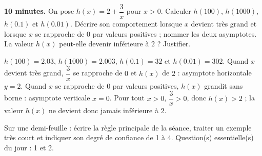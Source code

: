 
\begin{homework}\textbf{10 minutes.} On pose $h(x)=2+\dfrac3x$ pour $x>0$. Calculer $h(100)$, $h(\num{1000})$, $h(\num{0,1})$ et $h(\num{0,01})$. Décrire son comportement lorsque $x$ devient très grand et lorsque $x$ se rapproche de $0$ par valeurs positives ; nommer les deux asymptotes. La valeur $h(x)$ peut-elle devenir inférieure à $2$ ? Justifier.\end{homework}
\begin{solution}$h(100)=\num{2,03}$, $h(\num{1000})=\num{2,003}$, $h(\num{0,1})=32$ et $h(\num{0,01})=302$. Quand $x$ devient très grand, $\dfrac3x$ se rapproche de $0$ et $h(x)$ de $2$ : asymptote horizontale $y=2$. Quand $x$ se rapproche de $0$ par valeurs positives, $h(x)$ grandit sans borne : asymptote verticale $x=0$. Pour tout $x>0$, $\dfrac3x>0$, donc $h(x)>2$ ; la valeur $h(x)$ ne devient donc jamais inférieure à $2$.\end{solution}

\begin{exitticket}[3 minutes]Sur une demi-feuille : écrire la règle principale de la séance, traiter un exemple très court et indiquer son degré de confiance de 1 à 4. Question(s) essentielle(s) du jour : 1 et 2.\end{exitticket}

